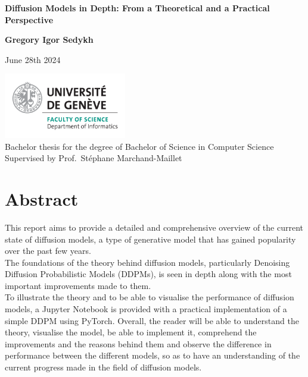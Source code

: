 \documentclass[twoside]{article}
\numberwithin{equation}{section}
\numberwithin{figure}{section}
\begin{document}
\begin{titlepage}
  \begin{center}
      \vspace*{1cm}

      \LARGE
      \textbf{Diffusion Models in Depth: From a Theoretical and a Practical Perspective}

      \vspace{1.5cm}

      \Large
      \textbf{Gregory Igor Sedykh}
      \vspace{0.8cm}

      \normalsize
      June 28th 2024

      \vfill

      \includegraphics[width=0.4\textwidth]{images/informatics_en.png} \\

      Bachelor thesis for the degree of Bachelor of Science in Computer Science \\
      Supervised by Prof.\ Stéphane Marchand-Maillet     

      \vspace{0.8cm}
           
  \end{center}
\end{titlepage}

\newpage
\section*{Abstract}

This report aims to provide a detailed and comprehensive overview of the current state of diffusion models, a type of generative model that has gained popularity over the past few years. \\
The foundations of the theory behind diffusion models, particularly Denoising Diffusion Probabilistic Models (DDPMs), is seen in depth along with the most important improvements made to them. \\
To illustrate the theory and to be able to visualise the performance of diffusion models, a Jupyter Notebook is provided with a practical implementation of a simple DDPM using PyTorch.
Overall, the reader will be able to understand the theory, visualise the model, be able to implement it, comprehend the improvements and the reasons behind them and observe the difference in performance between the different models, so as to have an understanding of the current progress made in the field of diffusion models.
\end{document}
